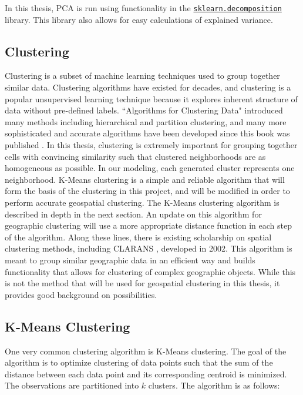 \documentclass[times new roman,12pt]{article}
\begin{document}
In this thesis, PCA is run using functionality in the \href{https://scikit-learn.org/stable/modules/generated/sklearn.decomposition.PCA.html}{\texttt{sklearn.decomposition}} library. This library also allows for easy calculations of explained variance. 

\subsection{Clustering}

Clustering is a subset of machine learning techniques used to group together similar data. Clustering algorithms have existed for decades, and clustering is a popular unsupervised learning technique because it explores inherent structure of data without pre-defined labels. ``Algorithms for Clustering Data" introduced many methods including hierarchical and partition clustering, and many more sophisticated and accurate algorithms have been developed since this book was published \cite{jain_anil_algorithms_1988}. In this thesis, clustering is extremely important for grouping together cells with convincing similarity such that clustered neighborhoods are as homogeneous as possible. In our modeling, each generated cluster represents one neighborhood. K-Means clustering is a simple and reliable algorithm that will form the basis of the clustering in this project, and will be modified in order to perform accurate geospatial clustering. The K-Means clustering algorithm is described in depth in the next section. An update on this algorithm for geographic clustering will use a more appropriate distance function in each step of the algorithm. Along these lines, there is existing scholarship on spatial clustering methods, including CLARANS \cite{ng_r.t._clarans:_2002}, developed in 2002. This algorithm is meant to group similar geographic data in an efficient way and builds functionality that allows for clustering of complex geographic objects. While this is not the method that will be used for geospatial clustering in this thesis, it provides good background on possibilities. 

\subsection{K-Means Clustering}
\label{kmeans}

One very common clustering algorithm is K-Means clustering. The goal of the algorithm is to optimize clustering of data points such that the sum of the distance between each data point and its corresponding centroid is minimized. The observations are partitioned into $k$ clusters. The algorithm is as follows: 
\end{document}
